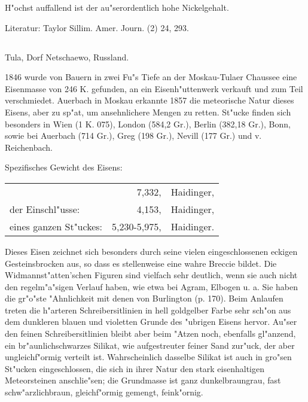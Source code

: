 \documentclass[a4paper, 11pt, oneside]{article}
\begin{document}
H"ochst auffallend ist der au"serordentlich hohe Nickelgehalt.

\normalsize
Literatur: Taylor Sillim. Amer. Journ. (2) 24, 293.

\subsection{}
\LARGE
\paragraph{}
Tula, Dorf Netschaewo, Russland.

1846 wurde von Bauern in zwei Fu"s Tiefe an der Moskau-Tulaer Chaussee eine Eisenmasse von 246 K. gefunden, an ein Eisenh"uttenwerk verkauft und zum Teil verschmiedet. Auerbach in Moskau erkannte 1857 die meteorische Natur dieses Eisens, aber zu sp"at, um ansehnlichere Mengen zu retten. St"ucke finden sich besonders in Wien (1 K. 075), London (584,2 Gr.), Berlin (382,18 Gr.), Bonn, sowie bei Auerbach (714 Gr.), Greg (198 Gr.), Nevill (177 Gr.) und v. Reichenbach.

Spezifisches Gewicht des Eisens: 
\begin{table}[!ht]
    \centering\swabfamily\Large
    \begin{tabular}{l r l}
         & 7,332, & Haidinger,\\
        der Einschl"usse: & 4,153, & Haidinger,\\
        eines ganzen St"uckes: & 5,230-5,975, & Haidinger.
    \end{tabular}
\end{table}

Dieses Eisen zeichnet sich besonders durch seine vielen eingeschlossenen eckigen Gesteinsbrocken aus, so dass es stellenweise eine wahre Breccie bildet. Die Widmannst"atten'schen Figuren sind vielfach sehr deutlich, wenn sie auch nicht den regelm"a"sigen Verlauf haben, wie etwa bei Agram, Elbogen u. a. Sie haben die gr"o"ste "Ahnlichkeit mit denen von Burlington (p. 170). Beim Anlaufen treten die h"arteren Schreibersitlinien in hell goldgelber Farbe sehr sch"on aus dem dunkleren blauen und violetten Grunde des "ubrigen Eisens hervor. Au"ser den feinen Schreibersitlinien bleibt aber beim "Atzen noch, ebenfalls gl"anzend, ein br"aunlichschwarzes Silikat, wie aufgestreuter feiner Sand zur"uck, der aber ungleichf"ormig verteilt ist. Wahrscheinlich dasselbe Silikat ist auch in gro"sen St"ucken eingeschlossen, die sich in ihrer Natur den stark eisenhaltigen Meteorsteinen anschlie"sen; die Grundmasse ist ganz dunkelbraungrau, fast schw"arzlichbraun, gleichf"ormig gemengt, feink"ornig.
\end{document}

